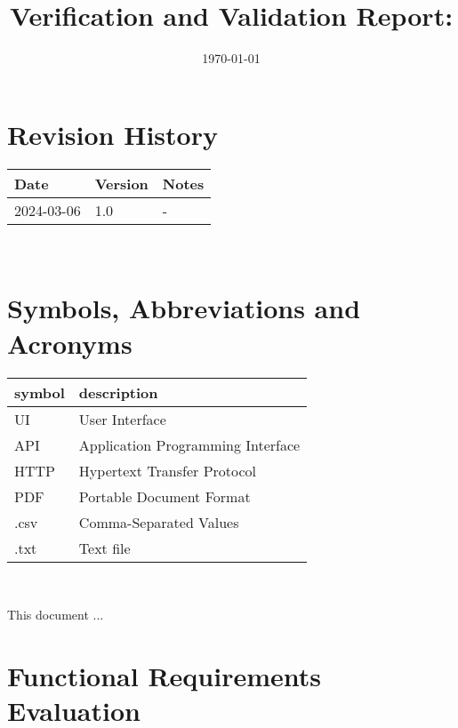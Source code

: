 \documentclass[12pt, titlepage]{article}
\begin{document}
\title{Verification and Validation Report: \progname} 
\author{\authname}
\date{\today}
	
\maketitle


\section{Revision History}

\begin{tabularx}{\textwidth}{p{3cm}p{2cm}X}
\toprule {\bf Date} & {\bf Version} & {\bf Notes}\\
\midrule
2024-03-06 & 1.0 & -\\
\bottomrule
\end{tabularx}

~\newpage

\section{Symbols, Abbreviations and Acronyms}

\renewcommand{\arraystretch}{1.2}
\begin{tabular}{l l} 
  \toprule		
  \textbf{symbol} & \textbf{description}\\
  \midrule 
      UI & User Interface \\
      API & Application Programming Interface\\
      HTTP & Hypertext Transfer Protocol\\
      PDF & Portable Document Format\\
      .csv & Comma-Separated Values \\
      .txt & Text file\\
  \bottomrule
  
\end{tabular}\\
\newpage

\tableofcontents

\listoftables %

\listoffigures %

\newpage


This document ...

\section{Functional Requirements Evaluation}
\end{document}

